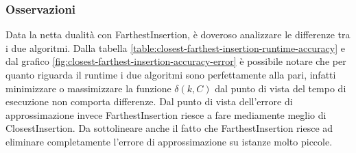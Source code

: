 \subsubsection{Osservazioni}

Data la netta dualità con FarthestInsertion, è doveroso analizzare
le differenze tra i due algoritmi. Dalla tabella
\ref{table:closest-farthest-insertion-runtime-accuracy}
e dal grafico \ref{fig:closest-farthest-insertion-accuracy-error}
è possibile notare che per quanto riguarda il runtime i due algoritmi
sono perfettamente alla pari, infatti minimizzare o massimizzare la
funzione $\delta (k, C)$ dal punto di vista del tempo di esecuzione
non comporta differenze. Dal punto di vista dell'errore di
approssimazione invece FarthestInsertion riesce a fare mediamente
meglio di ClosestInsertion. Da sottolineare anche il fatto che
FarthestInsertion riesce ad eliminare completamente l'errore di
approssimazione su istanze molto piccole.

